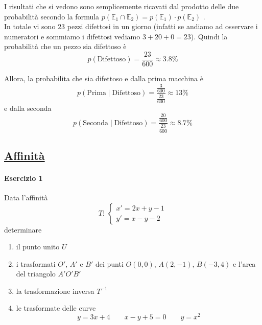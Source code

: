 I risultati che si vedono sono semplicemente ricavati dal prodotto delle due probabilità
secondo la formula $p\left(\mathbb{E}_1\cap\mathbb{E}_2\right) = p(\mathbb{E}_1)\cdot p(\mathbb{E}_2)$
.\\[\baselineskip]
In totale vi sono $23$ pezzi difettosi in un giorno (infatti se andiamo ad osservare i numeratori e 
sommiamo i difettosi vediamo $3+20+0 = 23$). Quindi la probabilità che un pezzo sia difettoso è
\begin{equation*}
  p(\text{Difettoso}) = \frac{23}{600} \approx \boxed{3.8\%}
\end{equation*}

Allora, la probabilita che sia difettoso e dalla prima macchina è
\begin{equation*}
  p\left(\text{Prima}\mid\text{Difettoso}\right) = \frac{\frac{3}{600}}{\frac{23}{600}} 
  \approx\boxed{13\%}
\end{equation*}
e dalla seconda
\begin{equation*}
  p\left(\text{Seconda}\mid\text{Difettoso}\right) = \frac{\frac{20}{600}}{\frac{23}{600}} 
  \approx\boxed{8.7\%}
\end{equation*}

\subsection*{\hyperref[sec:aff]{Affinità}}\label{ex:aff}
\paragraph{Esercizio 1}
Data l'affinità
\begin{equation*}
  T:\,\begin{cases}
    x'=2x+y-1\\y'=x-y-2
  \end{cases}
\end{equation*}
determinare
\begin{enumerate}
  \item il punto unito $U$
  \item i trasformati $O'$, $A'$ e $B'$ dei punti $O(0,0)$, $A(2,-1)$, $B(-3,4)$ e l'area del 
    triangolo $A'O'B'$
  \item la trasformazione inversa $T^{-1}$
  \item le trasformate delle curve
    \begin{equation*}
      y=3x+4\qquad x-y+5=0\qquad y=x^2
    \end{equation*}
\end{enumerate}
\divisor


